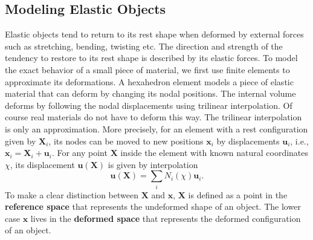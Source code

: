 \subsection{Modeling Elastic Objects}
Elastic objects tend to return to its rest shape when deformed by external forces such as stretching, bending, twisting etc. The direction and strength of the tendency to restore to its rest shape is described by its elastic forces.
To model the exact behavior of a small piece of material,
we first use finite elements to approximate its deformations.
A hexahedron element models a piece of elastic material that can deform by changing its nodal positions.
The internal volume deforms by following the nodal displacements using trilinear interpolation.
Of course real materials do not have to deform this way.
The trilinear interpolation is only an approximation.
More precisely, for an element with a rest configuration given by $\mathbf{X}_i$,
its nodes can be moved to new positions $\mathbf{x}_i$ by displacements $\mathbf{u}_i$,
i.e., $\mathbf{x}_i=\mathbf{X}_i+\mathbf{u}_i$.
For any point $\mathbf{X}$ inside the element with known natural coordinates $\chi$, its displacement $\mathbf{u}(\mathbf{X})$ is given by interpolation
\begin{equation}
\mathbf{u}(\mathbf{X}) = \sum_iN_i(\chi)\mathbf{u}_i.
\label{eq:disp}
\end{equation}
To make a clear distinction between $\mathbf{X}$ and $\mathbf{x}$,
$\mathbf{X}$ is defined as a point in the \textbf{reference space} that represents the undeformed shape of an object. The lower case $\mathbf{x}$ lives in the \textbf{deformed space} that represents the deformed configuration of an object.

